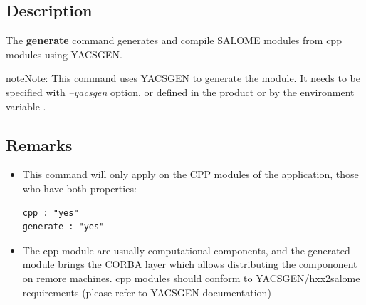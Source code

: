 \documentclass[a4paper,10pt,english]{sphinxmanual}
\begin{document}
\subsection{Description}
\label{commands/generate:description}
The \textbf{generate} command generates and compile SALOME modules from cpp modules using YACSGEN.

\begin{notice}{note}{Note:}
This command uses YACSGEN to generate the module. It needs to be specified with \emph{--yacsgen} option, or defined in the product or by the environment variable .
\end{notice}


\subsection{Remarks}
\label{commands/generate:remarks}\begin{itemize}
\item {} 
This command will only apply on the CPP modules of the application, those who have both properties:

\begin{Verbatim}[commandchars=\\\{\}]
cpp : "yes"
generate : "yes"
\end{Verbatim}

\item {} 
The cpp module are usually computational components, and the generated module brings the CORBA layer which allows distributing the compononent on remore machines. cpp modules should conform to YACSGEN/hxx2salome requirements (please refer to YACSGEN documentation)

\end{itemize}
\end{document}
